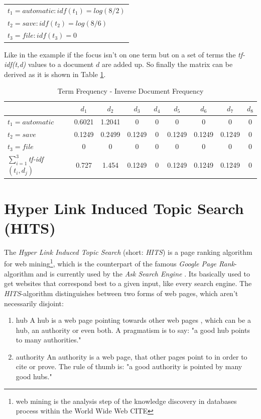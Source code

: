 \begin{table}[h]
  \centering
  \begin{tabular}{l}
    $t_1 = automatic : idf(t_1) = log(8/2)$  \\
    $t_2 = save : idf(t_2)=log(8/6)$ \\
    $t_3 = file : idf(t_3)=0$ 
 \end{tabular}
\end{table}

Like in the example if the focus isn't on one term but on a set of terms the \emph{tf-idf(t,d)} values to a document $d$ are added up. So finally the matrix can be derived as it is shown in Table \ref{tab:tfidf_table}.

\begin{table}[h]
  \centering
  \begin{tabular}{| l | c | c | c | c | c | c | c | c |}
    \hline
    & $d_1$ & $d_2$ & $d_3$ & $d_4$ & $d_5$ & $d_6$ & $d_7$ & $d_8$ \\ \hline
    $t_1 = automatic$ & 0.6021 & 1.2041 & 0 & 0 & 0 & 0 & 0 & 0 \\ \hline
    $t_2 = save$ & 0.1249 & 0.2499 & 0.1249 &0 & 0.1249 & 0.1249 & 0.1249 & 0 \\ \hline
    $t_3 = file $ & 0 & 0 & 0 & 0 & 0 & 0 & 0 & 0 \\ \hline \hline
    $\sum\nolimits_{i=1}^3$\emph{tf-idf}$(t_i,d_j)$ & 0.727 & 1.454 & 0.1249 & 0 & 0.1249 & 0.1249 & 0.1249 & 0\\ \hline
  \end{tabular}
  \label{tab:tfidf_table}
  \caption{Term Frequency - Inverse Document Frequency}
\end{table}

\section{Hyper Link Induced Topic Search (HITS)}

The \emph{Hyper Link Induced Topic Search} (short: \emph{HITS}) is a page ranking algorithm for web mining\footnote{\label{foot:1}web mining is the analysis step of the knowledge discovery in databases process within the World Wide Web CITE}, which is the counterpart of the famous \emph{Google Page Rank}-algorithm and is currently used by the \emph{Ask Search Engine} \cite{wiki:HITS}. Its basically used to get websites that correspond best to a given input, like every search engine. 
The \emph{HITS}-algorithm distinguishes between two forms of web pages, which aren't necessarily disjoint:
\begin{enumerate}
  \item hub \newline
  A hub is a web page pointing towards other web pages , which can be a hub, an authority or even both. A pragmatism is to say: "a good hub points to many authorities."
  \item authority \newline
  An authority is a web page, that other pages point to in order to cite or prove. The rule of thumb is: "a good authority is pointed by many good hubs."
\end{enumerate}

